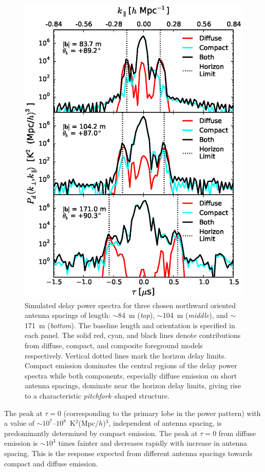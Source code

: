 \documentclass[preprint2,iop,numberedappendix,twocolappendix,appendixfloats]{emulateapj}
\begin{document}
\begin{figure}[htb]
\centering
\includegraphics[width=\linewidth]{figure8.eps}
\caption{Simulated delay power spectra for three chosen northward oriented antenna spacings of length: $\sim$84~m ({\it top}), $\sim$104~m ({\it middle}), and $\sim$171~m ({\it bottom}). The baseline length and orientation is specified in each panel. The solid red, cyan, and black lines denote contributions from diffuse, compact, and composite foreground models respectively. Vertical dotted lines mark the horizon delay limits. Compact emission dominates the central regions of the delay power spectra while both components, especially diffuse emission on short antenna spacings, dominate near the horizon delay limits, giving rise to a characteristic {\it pitchfork}--shaped structure. \label{fig:pitchfork-baselines}}
\end{figure}

The peak at $\tau=0$ (corresponding to the primary lobe in the power pattern) with a value of $\sim 10^7$--$10^8$~K$^2$(Mpc/$h$)$^3$, independent of antenna spacing, is predominantly determined by compact emission. The peak at $\tau=0$ from diffuse emission is $\sim 10^3$ times fainter and decreases rapidly with increase in antenna spacing. This is the response expected from different antenna spacings towards compact and diffuse emission. 
\end{document}
